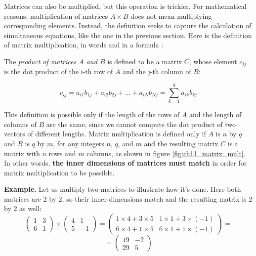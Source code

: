 \documentclass[
  letterpaper,
  DIV=11,
  numbers=noendperiod]{scrreprt}
\begin{document}
Matrices can also be multiplied, but this operation is trickier. For
mathematical reasons, multiplication of matrices \(A \times B\) does not
mean multiplying corresponding elements. Instead, the definition seeks
to capture the calculation of simultaneous equations, like the one in
the previous section. Here is the definition of matrix multiplication,
in words and in a formula \cite{strang_linear_2005}:

\begin{tcolorbox}[enhanced jigsaw, coltitle=black, arc=.35mm, opacitybacktitle=0.6, breakable, bottomtitle=1mm, toptitle=1mm, titlerule=0mm, colback=white, leftrule=.75mm, rightrule=.15mm, colframe=quarto-callout-note-color-frame, colbacktitle=quarto-callout-note-color!10!white, opacityback=0, title=\textcolor{quarto-callout-note-color}{\faInfo}\hspace{0.5em}{Definition}, left=2mm, toprule=.15mm, bottomrule=.15mm]

The \emph{product of matrices \(A\) and \(B\)} is defined to be a matrix
\(C\), whose element \(c_{ij}\) is the dot product of the i-th row of
\(A\) and the j-th column of \(B\):

\[ 
c_{ij} = a_{i1}b_{1j} + a_{i2}b_{2j} + ... + a_{iN}b_{Nj} = \sum_{k=1}^q a_{ik} b_{kj}
\]

\end{tcolorbox}

This definition is possible only if the length of the rows of \(A\) and
the length of columns of \(B\) are the same, since we cannot compute the
dot product of two vectors of different lengths. Matrix multiplication
is defined only if \(A\) is \(n\) by \(q\) and \(B\) is \(q\) by \(m\),
for any integers \(n\), \(q\), and \(m\) and the resulting matrix \(C\)
is a matrix with \(n\) rows and \(m\) columns, as shown in figure
\ref{fig:ch11_matrix_mult}. In other words, \textbf{the inner dimensions
of matrices must match} in order for matrix multiplication to be
possible.

\textbf{Example.} Let us multiply two matrices to illustrate how it's
done. Here both matrices are 2 by 2, so their inner dimensions match and
the resulting matrix is 2 by 2 as well: \[ 
\left(\begin{array}{cc}1 & 3 \\ 6 & 1\end{array}\right) \times \left(\begin{array}{cc}4 & 1 \\5 & -1 \end{array}\right) = \left(\begin{array}{cc}1 \times 4 + 3 \times 5 & 1 \times 1 +3 \times (-1) \\ 6 \times 4+ 1 \times 5 & 6 \times 1+1 \times (-1) \end{array}\right) = \]
\[= \left(\begin{array}{cc}19 & -2 \\ 29 & 5 \end{array}\right) 
\]
\end{document}
